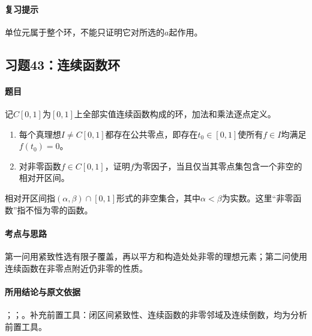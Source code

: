 \paragraph{复习提示}
单位元属于整个环，不能只证明它对所选的$a$起作用。


\subsection{习题43：\texorpdfstring{连续函数环}{连续函数环}}
\label{ex:1:43}

\paragraph{题目}
记$C[0,1]$为$[0,1]$上全部实值连续函数构成的环，加法和乘法逐点定义。
\begin{enumerate}
\item 每个真理想$I\ne C[0,1]$都存在公共零点，即存在$t_0\in[0,1]$使所有$f\in I$均满足$f(t_0)=0$。
\item 对非零函数$f\in C[0,1]$，证明$f$为零因子，当且仅当其零点集包含一个非空的相对开区间。
\end{enumerate}
相对开区间指$(\alpha,\beta)\cap[0,1]$形式的非空集合，其中$\alpha<\beta$为实数。这里“非零函数”指不恒为零的函数。

\paragraph{考点与思路}
第一问用紧致性选有限子覆盖，再以平方和构造处处非零的理想元素；第二问使用连续函数在非零点附近仍非零的性质。

\paragraph{所用结论与原文依据}
；；。补充前置工具：闭区间紧致性、连续函数的非零邻域及连续倒数，均为分析前置工具。


